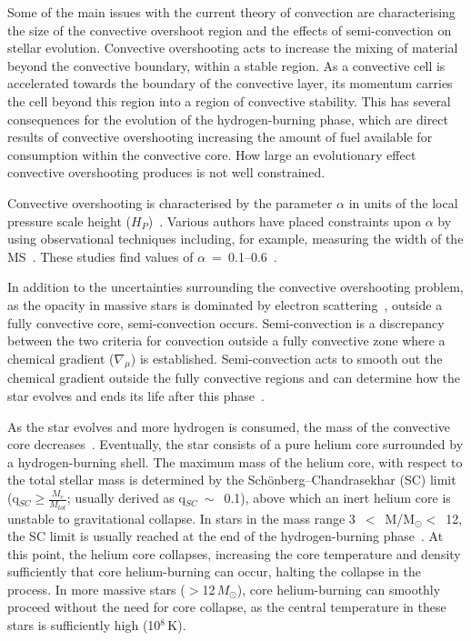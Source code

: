 Some of the main issues with the current theory of convection are characterising the size of the convective overshoot region and the effects of semi-convection on stellar evolution.
Convective overshooting acts to increase the mixing of material beyond the convective boundary, within a stable region.
As a convective cell is accelerated towards the boundary of the convective layer, its momentum carries the cell beyond this region into a region of convective stability.
This has several consequences for the evolution of the hydrogen-burning phase, which are direct results of convective overshooting increasing the amount of fuel available for consumption within the convective core.
How large an evolutionary effect convective overshooting produces is not well constrained.

Convective overshooting is characterised by the parameter $\alpha$ in units of the local pressure scale height ($H_{P}$)~\citep{2012sse..book.....K}.
Various authors have placed constraints upon $\alpha$ by using observational techniques including, for example, measuring the width of the MS~\citep{Schroder97,Brott11}.
These studies find values of $\alpha$~=~0.1--0.6~\citep[e.g.][who found $\alpha = 0.335$]{Brott11}.

In addition to the uncertainties surrounding the convective overshooting problem, as the opacity in massive stars is dominated by electron scattering~\citep{b:Bohm-vitense92.v3}, outside a fully convective core, semi-convection occurs.
Semi-convection is a discrepancy between the two criteria for convection outside a fully convective zone where a chemical gradient ($\nabla _{\mu}$) is established.
Semi-convection acts to smooth out the chemical gradient outside the fully convective regions and can determine how the star evolves and ends its life after this phase~\citep[e.g.][]{1989A&A...224L..17L}.

As the star evolves and more hydrogen is consumed, the mass of the convective core decreases~\citep{2012sse..book.....K}.
Eventually, the star consists of a pure helium core surrounded by a hydrogen-burning shell.
The maximum mass of the helium core, with respect to the total stellar mass is determined by the Sch\"onberg--Chandrasekhar (SC) limit
(q$_{SC}\geq\frac{M_{c}}{M_{tot}}$; usually derived as q$_{SC}~\sim$~0.1), above which an inert helium core is unstable to gravitational collapse.
In stars in the mass range 3~$<$~M/M$_{\odot}<$~12, the SC limit is usually reached at the end of the hydrogen-burning phase~\citep{b:SalarisCassisi05}.
At this point, the helium core collapses, increasing the core temperature and density sufficiently that core helium-burning can occur, halting the collapse in the process.
In more massive stars ($>$12\,$M_{\odot}$), core helium-burning can smoothly proceed without the need for core collapse, as the central temperature in these stars is sufficiently high (10$^{8}$\,K).

